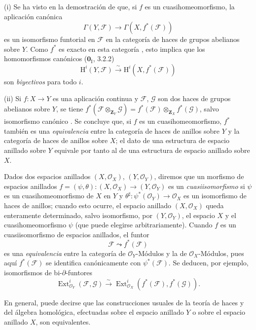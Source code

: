 \begin{remarks}[10.2.8]
\label{IV.10.2.8}
(i) Se ha visto en la demostración de  que, si $f$ es un cuasihomeomorfismo, la aplicación canónica
\begin{equation}
\label{IV.10.2.8.1-fr}
\tag{10.2.8.1}
\Gamma(Y,\mathcal F)\to\Gamma(X,f^*(\mathcal F))
\end{equation}
es un isomorfismo funtorial en $\mathcal F$ en la categoría de haces de grupos abelianos sobre $Y$.
Como $f^*$ es exacto en esta categoría , esto implica que los homomorfismos canónicos ($\mathbf 0_{\mathrm I}$, 3.2.2)
\[
\mathrm H^i(Y,\mathcal F)\xrightarrow{\sim}
\mathrm H^i(X,f^*(\mathcal F))
\]
son \emph{biyectivos} para todo $i$.

(ii) Si $f:X\to Y$ es una aplicación continua y $\mathcal F$, $\mathcal G$ son dos haces de grupos abelianos sobre $Y$, se tiene $f^*(\mathcal F\otimes_{\mathbf Z_Y}\mathcal G)=f^*(\mathcal F)\otimes_{\mathbf Z_X}f^*(\mathcal G)$, salvo isomorfismo canónico .
Se concluye que, si $f$ es un cuasihomeomorfismo, $f^*$ también es una \emph{equivalencia} entre la categoría de haces de anillos sobre $Y$ y la categoría de haces de anillos sobre $X$; el dato de una estructura de espacio anillado sobre $Y$ equivale por tanto al de una estructura de espacio anillado sobre $X$.

Dados dos espacios anillados $(X,\mathcal O_X)$, $(Y,\mathcal O_Y)$, diremos que un morfismo de espacios anillados $f=(\psi,\theta):(X,\mathcal O_X)\to(Y,\mathcal O_Y)$ es un \emph{cuasiisomorfismo} si $\psi$ es un cuasihomeomorfismo de $X$ en $Y$ y $\theta^\sharp:\psi^*(\mathcal O_Y)\to\mathcal O_X$ es un isomorfismo de haces de anillos; cuando esto ocurre, el espacio anillado $(X,\mathcal O_X)$ queda enteramente determinado, salvo isomorfismo, por $(Y,\mathcal O_Y)$, el espacio $X$ y el cuasihomeomorfismo $\psi$ (que puede elegirse arbitrariamente).
Cuando $f$ es un cuasiisomorfismo de espacios anillados, el funtor
\[
\mathcal F\leadsto f^*(\mathcal F)
\]
es una \emph{equivalencia} entre la categoría de $\mathcal O_Y$-Módulos y la de $\mathcal O_X$-Módulos, pues aquí $f^*(\mathcal F)$ se identifica canónicamente con $\psi^*(\mathcal F)$.
Se deducen, por ejemplo, isomorfismos de bi-$\partial$-funtores
\[
\operatorname{Ext}^i_{\mathcal O_Y}(\mathcal F,\mathcal G)
\xrightarrow{\sim}
\operatorname{Ext}^i_{\mathcal O_X}(f^*(\mathcal F),f^*(\mathcal G)).
\]

En general, puede decirse que las construcciones usuales de la teoría de haces y del álgebra homológica, efectuadas sobre el espacio anillado $Y$ o sobre el espacio anillado $X$, son equivalentes.
\end{remarks}

